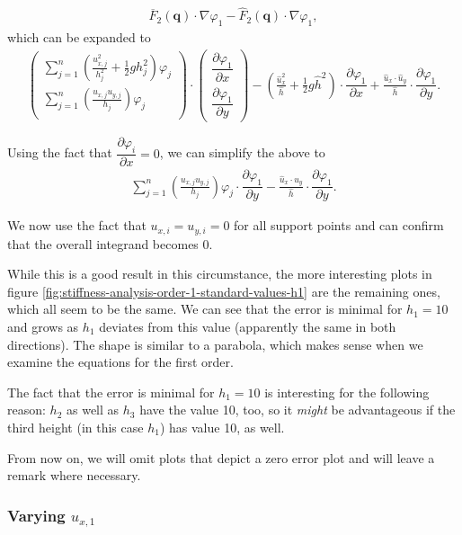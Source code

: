 \documentclass{article}
\newcommand{\pd}[2]{\dfrac{\partial #1}{\partial #2}}
\renewcommand{\phi}{\varphi}
\begin{document}
\begin{align*}
  \overline{F}_2(\mathbf{q}) \cdot \nabla \phi_1 - \widehat{F}_2(\mathbf{q}) \cdot \nabla \phi_1,
\end{align*}
which can be expanded to
\begin{align*}
  \begin{pmatrix}
    \sum_{j=1}^n \left(\frac{u_{x,j}^2}{h_j^2} + \frac{1}{2} g h_j^2\right) \phi_j \\
    \sum_{j=1}^n \left(\frac{u_{x,j} u_{y,j}}{h_j}\right) \phi_j \\
  \end{pmatrix}
  \cdot
  \begin{pmatrix}
    \pd{\phi_1}{x} \\
    \pd{\phi_1}{y}
  \end{pmatrix} -
  \left( \frac{\widehat{u}_x^2}{\widehat{h}} + \frac{1}{2} g \widehat{h}^2 \right) \cdot \pd{\phi_1}{x} +
  \frac{\widehat{u}_x \cdot \widehat{u}_y }{\widehat{h}} \cdot \pd{\phi_1}{y}.
\end{align*}

Using the fact that $\pd{\phi_i}x = 0$, we can simplify the above to
\begin{align*}
    \sum_{j=1}^n \left(\frac{u_{x,j} u_{y,j}}{h_j}\right) \phi_j
    \cdot
    \pd{\phi_1}{y} -
    \frac{\widehat{u}_x \cdot \widehat{u}_y }{\widehat{h}} \cdot \pd{\phi_1}{y}.
\end{align*}

We now use the fact that $u_{x,i}=u_{y,i}=0$ for all support points and can confirm that the overall integrand becomes 0.

While this is a good result in this circumstance, the more interesting plots in figure \ref{fig:stiffness-analysis-order-1-standard-values-h1} are the remaining ones, which all seem to be the same. We can see that the error is minimal for $h_1=10$ and grows as $h_1$ deviates from this value (apparently the same in both directions). The shape is similar to a parabola, which makes sense when we examine the equations for the first order.

The fact that the error is minimal for $h_1=10$ is interesting for the following reason: $h_2$ as well as $h_3$ have the value 10, too, so it \emph{might} be advantageous if the third height (in this case $h_1$) has value 10, as well.

From now on, we will omit plots that depict a zero error plot and will leave a remark where necessary.

\subsubsection{\texorpdfstring{Varying $u_{x,1}$}{Varying ux1}}
\end{document}
